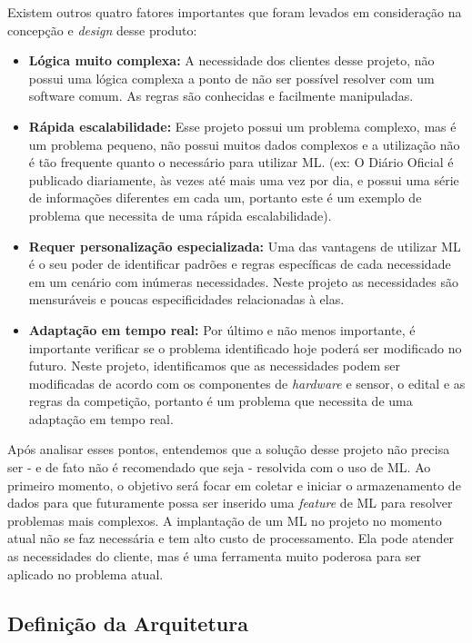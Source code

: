 Existem outros quatro fatores importantes que foram levados em consideração na concepção e \textit{design} desse produto:

\begin{itemize}
    \item \textbf{Lógica muito complexa:} A necessidade dos clientes desse projeto, não possui uma lógica complexa a ponto de não ser possível resolver com um software comum. As regras são conhecidas e facilmente manipuladas.
    
    \item \textbf{Rápida escalabilidade:} Esse projeto possui um problema complexo, mas é um problema pequeno, não possui muitos dados complexos e a utilização não é tão frequente quanto o necessário para utilizar ML. (ex: O Diário Oficial é publicado diariamente, às vezes até mais uma vez por dia, e possui uma série de informações diferentes em cada um, portanto este é um exemplo de problema que necessita de uma rápida escalabilidade).
    
    \item \textbf{Requer personalização especializada:} Uma das vantagens de utilizar ML é o seu poder de identificar padrões e regras específicas de cada necessidade em um cenário com inúmeras necessidades. Neste projeto as necessidades são mensuráveis e poucas especificidades relacionadas à elas.
    
    \item \textbf{Adaptação em tempo real:} Por último e não menos importante, é importante verificar se o problema identificado hoje poderá ser modificado no futuro. Neste projeto, identificamos que as necessidades podem ser modificadas de acordo com os componentes de \textit{hardware} e sensor, o edital e as regras da competição, portanto é um problema que necessita de uma adaptação em tempo real.
\end{itemize}

Após analisar esses pontos, entendemos que a solução desse projeto não precisa ser - e de fato não é recomendado que seja - resolvida com o uso de ML. Ao primeiro momento, o objetivo será focar em coletar e iniciar o armazenamento de dados para que futuramente possa ser inserido uma \textit{feature} de ML para resolver problemas mais complexos. A implantação de um ML no projeto no momento atual não se faz necessária e tem alto custo de processamento. Ela pode atender as necessidades do cliente, mas é uma ferramenta muito poderosa para ser aplicado no problema atual.


\subsection{Definição da Arquitetura}


